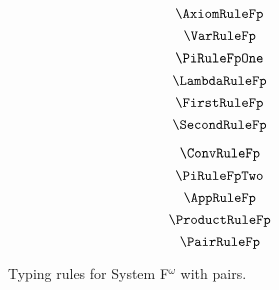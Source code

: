 
\begin{figure}
    \centering
    \begin{minipage}{0.5\textwidth}
        $$\AxiomRuleFp$$
        $$\VarRuleFp$$
        $$\PiRuleFpOne$$
        $$\LambdaRuleFp$$
        $$\FirstRuleFp$$
        $$\SecondRuleFp$$
    \end{minipage}%
    \begin{minipage}{0.5\textwidth}
        $$\ConvRuleFp$$
        $$\PiRuleFpTwo$$
        $$\AppRuleFp$$
        $$\ProductRuleFp$$
        $$\PairRuleFp$$
    \end{minipage}%
    \caption{
        Typing rules for System F$^\omega$ with pairs.
    }
    \label{fig:typing_fp}
\end{figure}
